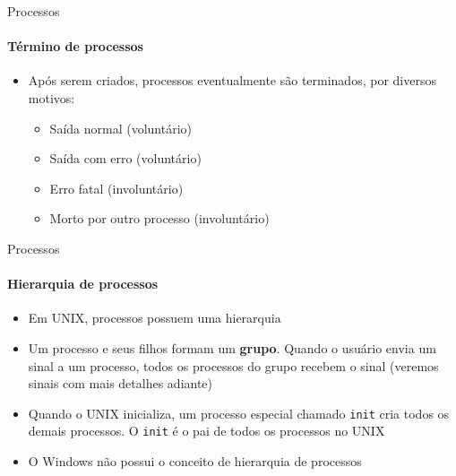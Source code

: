 \documentclass{beamer}
\begin{document}
\begin{frame}{Processos}
	\framesubtitle{Término de processos}
	\begin{itemize}
		\item Após serem criados, processos eventualmente são terminados, por diversos motivos:
		\begin{itemize}
			\item Saída normal (voluntário)
			\item Saída com erro (voluntário)
			\item Erro fatal (involuntário)
			\item Morto por outro processo (involuntário)
		\end{itemize}
	\end{itemize}
\end{frame}
\begin{frame}{Processos}
	\framesubtitle{Hierarquia de processos}
	\begin{itemize}
		\item Em UNIX, processos possuem uma hierarquia
		\item Um processo e seus filhos formam um \textbf{grupo}. Quando o usuário envia um sinal a um processo, todos os processos do grupo recebem o sinal (veremos sinais com mais detalhes adiante)
		\item Quando o UNIX inicializa, um processo especial chamado \alert{\texttt{init}} cria todos os demais processos. O \texttt{init} é o pai de todos os processos no UNIX
		\item O Windows não possui o conceito de hierarquia de processos
	\end{itemize}
\end{frame}
\end{document}
